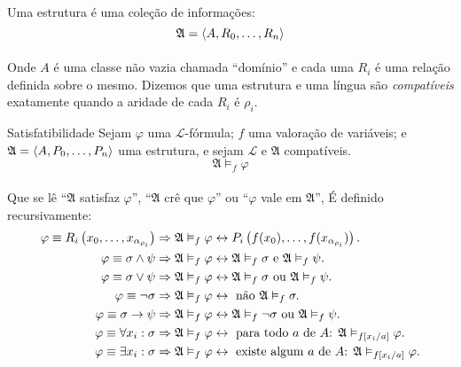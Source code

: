         \paragraph{}
            Uma estrutura é uma coleção de informações:
            $$\mathfrak{A} = \TUPLE{A}{R_0}{\ldots}{R_n}$$
        \paragraph{}
            Onde $A$ é uma classe não vazia chamada ``domínio'' 
            e cada uma $R_i$ é uma relação definida 
            sobre o mesmo. Dizemos que uma estrutura 
            e uma língua são {\em compatíveis} 
            exatamente quando a aridade de cada $R_i$ 
            é $\rho_i$.

        \begin{definition}{Satisfatibilidade}
                Sejam $\varphi$ uma $\mathcal{L}$-fórmula; 
                $f$ uma valoração de variáveis; e 
                $\mathfrak{A} = \TUPLE{A}{P_0}{\ldots}{P_n}$
                uma estrutura, e sejam $\mathcal{L}$ e 
                $\mathfrak{A}$ compatíveis.
                $$ \mathfrak A\vDash_f\varphi$$
            \paragraph{}
                Que se lê  ``$\mathfrak{A}$ satisfaz 
                $\varphi$'', ``$\mathfrak{A}$ crê que 
                $\varphi$'' ou ``$\varphi$ vale em 
                $\mathfrak{A}$'', É definido recursivamente:
            \begin{align*}
                \varphi\equiv R_i\POINT{x_0}{\ldots}{x_{\alpha_{\rho_i}}}
                    &\RAR \mathfrak A\vDash_f\varphi \bim P_i\POINT{f(x_0)}{\ldots}{f(x_{\alpha_{\rho_i}})}.\\
                \varphi\equiv \sigma\land\psi    
                    &\RAR \mathfrak A\vDash_f\varphi \bim \mathfrak A\vDash_f\sigma \text{ e } \mathfrak A\vDash_f\psi.\\
                \varphi\equiv \sigma\lor \psi    
                    &\RAR \mathfrak A\vDash_f\varphi \bim \mathfrak A\vDash_f\sigma \text{ ou } \mathfrak A\vDash_f\psi.\\
                \varphi\equiv \neg\sigma         
                    &\RAR \mathfrak A\vDash_f\varphi \bim \text{ não }\mathfrak A\vDash_f\sigma.\\
                \varphi\equiv \sigma\rar\psi         
                    &\RAR \mathfrak A\vDash_f\varphi \bim \mathfrak A\vDash_f\neg\sigma \text{ ou } \mathfrak A\vDash_f\psi.\\
                \varphi\equiv \forall x_i:\sigma 
                    &\RAR \mathfrak A\vDash_f\varphi \bim \text{ para todo $a$ de $A$: } \mathfrak A\vDash_{f[x_i\slash{a}]}\varphi.\\
                \varphi\equiv \exists x_i:\sigma 
                    &\RAR \mathfrak A\vDash_f\varphi \bim \text{ existe algum $a$ de $A$: } \mathfrak A\vDash_{f[x_i\slash{a}]}\varphi.
            \end{align*}

\end{definition}
